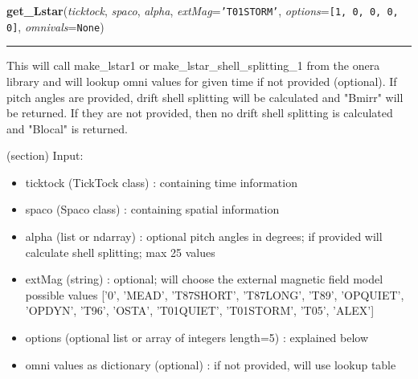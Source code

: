     \label{spacepy:onerapy:get_Lstar}

    \vspace{0.5ex}

\hspace{.8\funcindent}\begin{boxedminipage}{\funcwidth}

    \raggedright \textbf{get\_Lstar}(\textit{ticktock}, \textit{spaco}, \textit{alpha}, \textit{extMag}={\tt \texttt{'}\texttt{T01STORM}\texttt{'}}, \textit{options}={\tt \texttt{[}1\texttt{, }0\texttt{, }0\texttt{, }0\texttt{, }0\texttt{]}}, \textit{omnivals}={\tt None})

    \vspace{-1.5ex}

    \rule{\textwidth}{0.5\fboxrule}
\setlength{\parskip}{2ex}
    This will call make\_lstar1 or make\_lstar\_shell\_splitting\_1 from 
    the onera library and will lookup omni values for given time if not 
    provided (optional). If pitch angles are provided, drift shell 
    splitting will be calculated and "Bmirr" will be returned. If they are 
    not provided, then no drift shell splitting is calculated and "Blocal" 
    is returned.

    (section) Input:

      \begin{itemize}
      \setlength{\parskip}{0.6ex}
        \item ticktock (TickTock class) : containing time information

        \item spaco (Spaco class) : containing spatial information

        \item alpha (list or ndarray) : optional pitch angles in degrees; if 
          provided will calculate shell splitting; max 25 values

        \item extMag (string) : optional; will choose the external magnetic 
          field model possible values ['0', 'MEAD', 'T87SHORT', 'T87LONG', 
          'T89', 'OPQUIET', 'OPDYN', 'T96', 'OSTA', 'T01QUIET', 'T01STORM',
          'T05', 'ALEX']

        \item options (optional list or array of integers length=5) : explained
          below

        \item omni values as dictionary (optional) : if not provided, will use 
          lookup table


\end{itemize}
\end{boxedminipage}
